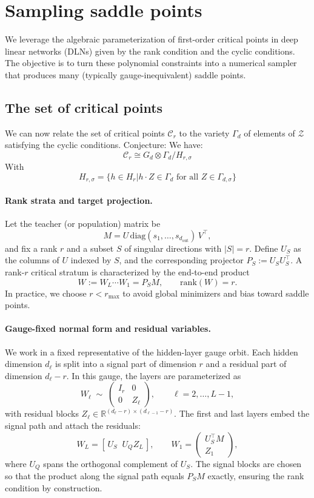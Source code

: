 \documentclass{article}
\theoremstyle{definition}
\begin{document}
\section{Sampling saddle points}

We leverage the algebraic parameterization of first-order critical points in deep linear networks (DLNs) given by the rank condition and the cyclic conditions. The objective is to turn these polynomial constraints into a numerical sampler that produces many (typically gauge-inequivalent) saddle points.
\subsection{The set of critical points}
We can now relate the set of critical points $\mathcal{C}_r$ to the variety $\Gamma_d$ of elements of $\mathcal{Z}$ satisfying the cyclic conditions. Conjecture: We have:
\begin{equation*}
\mathcal{C}_r \cong G_d \otimes \Gamma_d/H_{r,\sigma}
\end{equation*}
With
\begin{equation*}
H_{r,\sigma} = \{h\in H_r| h\cdot Z \in \Gamma_d \text{ for all } Z\in\Gamma_{d,\sigma}\}
\end{equation*}
\paragraph{Rank strata and target projection.}
Let the teacher (or population) matrix be
\[
M = U \,\mathrm{diag}(s_1,\dots,s_{d_{\mathrm{out}}})\, V^\top,
\]
and fix a rank \(r\) and a subset \(S\) of singular directions with \(|S|=r\). Define \(U_S\) as the columns of \(U\) indexed by \(S\), and the corresponding projector \(P_S := U_S U_S^\top\). A rank-\(r\) critical stratum is characterized by the end-to-end product
\[
W := W_L\cdots W_1 = P_S M, 
\qquad 
\mathrm{rank}(W)=r.
\]
In practice, we choose \(r<r_{\max}\) to avoid global minimizers and bias toward saddle points.

\paragraph{Gauge-fixed normal form and residual variables.}
We work in a fixed representative of the hidden-layer gauge orbit. Each hidden dimension \(d_\ell\) is split into a signal part of dimension \(r\) and a residual part of dimension \(d_\ell-r\). In this gauge, the layers are parameterized as
\[
W_\ell \;\sim\;
\begin{pmatrix}
I_r & 0\\
0 & Z_\ell
\end{pmatrix},
\qquad \ell=2,\dots,L-1,
\]
with residual blocks \(Z_\ell\in\mathbb{R}^{(d_\ell-r)\times(d_{\ell-1}-r)}\). The first and last layers embed the signal path and attach the residuals:
\[
W_L = [\, U_S \;\; U_Q Z_L \,],\qquad
W_1 = 
\begin{pmatrix}
U_S^\top M\\
Z_1
\end{pmatrix},
\]
where \(U_Q\) spans the orthogonal complement of \(U_S\). The signal blocks are chosen so that the product along the signal path equals \(P_S M\) exactly, ensuring the rank condition by construction.
\end{document}
